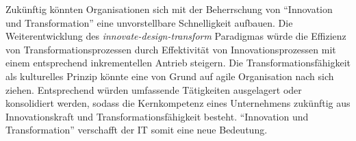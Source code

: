 Zukünftig könnten Organisationen sich mit der Beherrschung von \enquote{Innovation und Transformation} eine unvorstellbare Schnelligkeit aufbauen.
Die Weiterentwicklung des \emph{innovate-design-transform} Paradigmas würde die Effizienz von Transformationsprozessen durch Effektivität von Innovationsprozessen mit einem entsprechend inkrementellen Antrieb steigern. Die Transformationsfähigkeit als kulturelles Prinzip könnte eine von Grund auf agile Organisation nach sich ziehen. Entsprechend würden umfassende Tätigkeiten ausgelagert oder konsolidiert werden, sodass die Kernkompetenz eines Unternehmens zukünftig aus Innovationskraft und Transformationsfähigkeit besteht. \enquote{Innovation und Transformation} verschafft der IT somit eine neue Bedeutung.